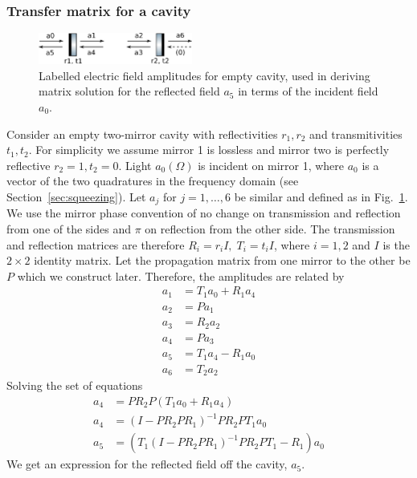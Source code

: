 \documentclass[aps,pra,superscriptaddress,reprint,nofootinbib]{revtex4-1}
\begin{document}
\subsubsection{Transfer matrix for a cavity}

\begin{figure}[ht]
	\begin{center}
	\includegraphics[width=0.45\textwidth]{figures/empty_cavity_amplitudes.pdf}
	\end{center}
	\caption{Labelled electric field amplitudes for empty cavity, used in deriving matrix solution for the reflected field $a_5$ in terms of the incident field $a_0$.}
	\label{fig:empty_cavity_amplitudes}
\end{figure}

Consider an empty two-mirror cavity with reflectivities $r_1, r_2$ and transmitivities $t_1, t_2$. For simplicity we assume mirror 1 is lossless and mirror two is perfectly reflective $r_2 = 1, t_2 = 0$. Light $a_0(\Omega)$ is incident on mirror 1, where $a_0$ is a vector of the two quadratures in the frequency domain (see Section~\ref{sec:squeezing}). Let $a_j$ for $j = 1, \ldots, 6$ be similar and defined as in Fig.~\ref{fig:empty_cavity_amplitudes}. We use the mirror phase convention of no change on transmission and reflection from one of the sides and $\pi$ on reflection from the other side. The transmission and reflection matrices are therefore $R_i = r_i I,\; T_i = t_i I$, where $i = 1, 2$ and $I$ is the $2 \times 2$ identity matrix. Let the propagation matrix from one mirror to the other be $P$ which we construct later. Therefore, the amplitudes are related by
\begin{align*}
a_1 &= T_1 a_0 + R_1 a_4\\
a_2 &= P a_1\\
a_3 &= R_2 a_2 \\
a_4 &= P a_3\\
a_5 &= T_1 a_4 - R_1 a_0\\
a_6 &= T_2 a_2
\end{align*}
Solving the set of equations
\begin{align*}
a_4 &= P R_2 P (T_1 a_0 + R_1 a_4) \\
a_4 &= (I - P R_2 P R_1)^{-1} P R_2 P T_1 a_0 \\
a_5 &= \left(T_1 (I - P R_2 P R_1)^{-1} P R_2 P T_1 - R_1\right) a_0
\end{align*}
We get an expression for the reflected field off the cavity, $a_5$.
\end{document}
